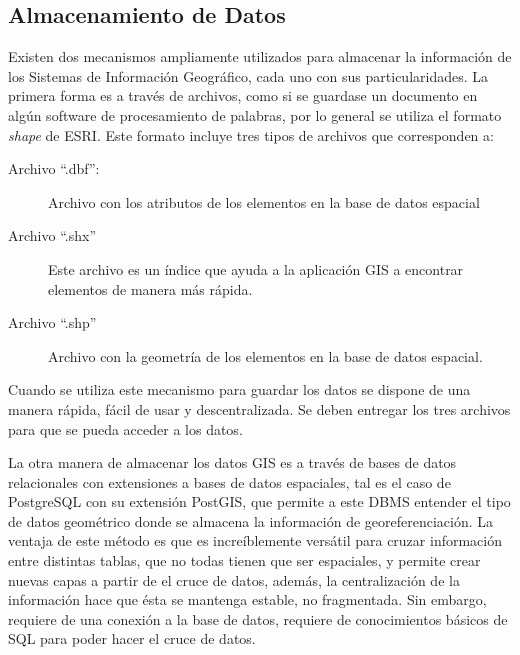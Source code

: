 \subsection{Almacenamiento de Datos}
Existen dos mecanismos ampliamente utilizados para almacenar la información de los Sistemas de
Información Geográfico, cada uno con sus particularidades. La primera forma es a través de archivos,
como si se guardase un documento en algún software de procesamiento de palabras, por lo general se
utiliza el formato \emph{shape} de ESRI. Este formato
incluye tres tipos de archivos que corresponden a:
\begin{description}
  \item[Archivo ``.dbf'':] Archivo con los atributos de los elementos en la base de datos espacial
  \item[Archivo ``.shx''] Este archivo es un índice que ayuda a la aplicación GIS a encontrar
  elementos de manera más rápida.
  \item[Archivo ``.shp''] Archivo con la geometría de los elementos en la base de datos espacial.
\end{description}

Cuando se utiliza este mecanismo para guardar los datos se dispone de una manera rápida, fácil de
usar y descentralizada. Se deben entregar los tres archivos para que se pueda acceder a los datos.

La otra manera de almacenar los datos GIS es a través de bases de datos relacionales con extensiones
a bases de datos espaciales, tal es el caso de PostgreSQL con su extensión PostGIS, que permite a
este DBMS entender el tipo de datos geométrico donde se almacena la información de
georeferenciación. La ventaja de este método es que es increíblemente versátil para cruzar
información entre distintas tablas, que no todas tienen que ser espaciales, y permite crear nuevas
capas a partir de el cruce de datos, además, la centralización de la información hace que ésta se
mantenga estable, no fragmentada. Sin embargo, requiere de una conexión a la base de datos,
requiere de conocimientos básicos de SQL para poder hacer el cruce de datos.
